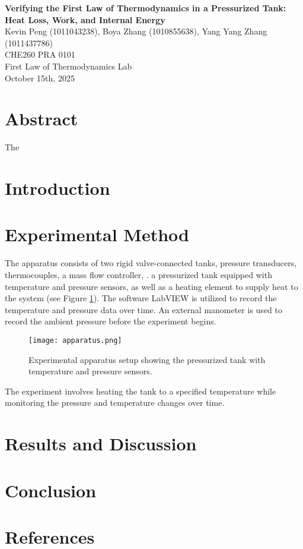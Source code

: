 \documentclass[12pt]{article}
\begin{document}
\begin{center}
\textbf{\Large Verifying the First Law of Thermodynamics in a Pressurized Tank: Heat Loss, Work, and Internal Energy} \\[0.5em]
Kevin Peng (1011043238), Boya Zhang (1010855638), Yang Yang Zhang (1011437786)\\[0.5em]
CHE260 PRA 0101 \\
First Law of Thermodynamics Lab \\
October 15th, 2025 \\
\end{center}

\section*{Abstract}
The 

\section{Introduction}

\section{Experimental Method}
The apparatus consists of two rigid valve-connected tanks, pressure transducers, thermocouples, a mass flow controller, .
a pressurized tank equipped with temperature and pressure sensors, as well as a heating element to supply heat to the system (see Figure \ref{fig:apparatus}).
The software LabVIEW is utilized to record the temperature and pressure data over time. An external manometer is used to record the ambient pressure before the experiment begins. 
\begin{figure}[H]
    \centering
    \texttt{[image: apparatus.png]}
    \caption{Experimental apparatus setup showing the pressurized tank with temperature and pressure sensors.}
    \label{fig:apparatus}
\end{figure}


The experiment involves heating the tank to a specified temperature while monitoring the pressure and temperature changes over time.


\section{Results and Discussion}

\section{Conclusion}


\section{References}






\newpage
\begin{thebibliography}{9}

\end{thebibliography}
\end{document}
